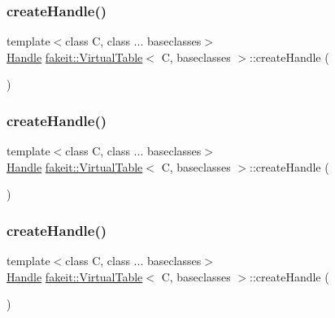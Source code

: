 \subsubsection{\texorpdfstring{createHandle()}{createHandle()}\hspace{0.1cm}{\footnotesize\ttfamily [1/10]}}
{\footnotesize\ttfamily template$<$class C, class ... baseclasses$>$ \\
\mbox{\hyperlink{classfakeit_1_1VirtualTable_1_1Handle}{Handle}} \mbox{\hyperlink{structfakeit_1_1VirtualTable}{fakeit\+::\+Virtual\+Table}}$<$ C, baseclasses $>$\+::create\+Handle (\begin{DoxyParamCaption}{ }\end{DoxyParamCaption})\hspace{0.3cm}{\ttfamily [inline]}}

\mbox{\label{structfakeit_1_1VirtualTable_a616ff0e7567c8c5f368faff1dca949df}} 
\subsubsection{\texorpdfstring{createHandle()}{createHandle()}\hspace{0.1cm}{\footnotesize\ttfamily [2/10]}}
{\footnotesize\ttfamily template$<$class C, class ... baseclasses$>$ \\
\mbox{\hyperlink{classfakeit_1_1VirtualTable_1_1Handle}{Handle}} \mbox{\hyperlink{structfakeit_1_1VirtualTable}{fakeit\+::\+Virtual\+Table}}$<$ C, baseclasses $>$\+::create\+Handle (\begin{DoxyParamCaption}{ }\end{DoxyParamCaption})\hspace{0.3cm}{\ttfamily [inline]}}

\mbox{\label{structfakeit_1_1VirtualTable_a616ff0e7567c8c5f368faff1dca949df}} 
\subsubsection{\texorpdfstring{createHandle()}{createHandle()}\hspace{0.1cm}{\footnotesize\ttfamily [3/10]}}
{\footnotesize\ttfamily template$<$class C, class ... baseclasses$>$ \\
\mbox{\hyperlink{classfakeit_1_1VirtualTable_1_1Handle}{Handle}} \mbox{\hyperlink{structfakeit_1_1VirtualTable}{fakeit\+::\+Virtual\+Table}}$<$ C, baseclasses $>$\+::create\+Handle (\begin{DoxyParamCaption}{ }\end{DoxyParamCaption})\hspace{0.3cm}{\ttfamily [inline]}}

